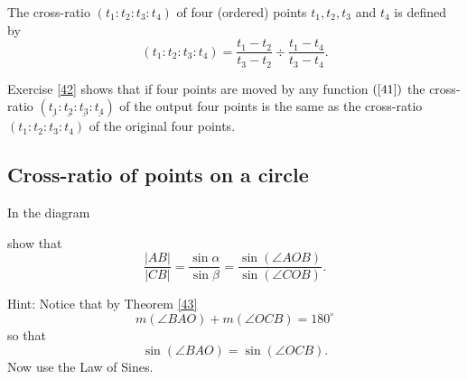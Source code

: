 \begin{definition}
\label{44}The cross-ratio $\left(  t_{1}:t_{2}:t_{3}:t_{4}\right)  $ of four
(ordered) points $t_{1},t_{2},t_{3}$ and $t_{4}$ is defined by%
\[
\left(  t_{1}:t_{2}:t_{3}:t_{4}\right)  =\frac{t_{1}-t_{2}}{t_{3}-t_{2}}%
\div\frac{t_{1}-t_{4}}{t_{3}-t_{4}}.
\]

\end{definition}

Exercise \ref{42} shows that if four points are moved by any function $\left(
\ref{41}\right)  $ the cross-ratio $\left(  \underline{t_{1}}:\underline
{t_{2}}:\underline{t_{3}}:\underline{t_{4}}\right)  $ of the output four
points is the same as the cross-ratio $\left(  t_{1}:t_{2}:t_{3}:t_{4}\right)
$ of the original four points.\pagebreak

\subsection*{Cross-ratio of points on a circle}

\begin{exercise}\label{46}
In the diagram
\begin{image}
\end{image}
show that%
\[
\frac{\left\vert AB\right\vert }{\left\vert CB\right\vert }=\frac
{\sin\alpha}{\sin\beta}=\frac{\sin\left(  \angle
AOB\right)  }{\sin\left(  \angle COB\right)  }.
\]


Hint: Notice that by Theorem \ref{43}
\[
m\left(  \angle BAO\right)  +m\left(\angle OCB\right)  =180^{\circ}%
\]
so that%
\[
\sin\left(  \angle BAO\right)  =\sin\left(\angle  OCB\right)  .
\]
Now use the Law of Sines.
\end{exercise}

